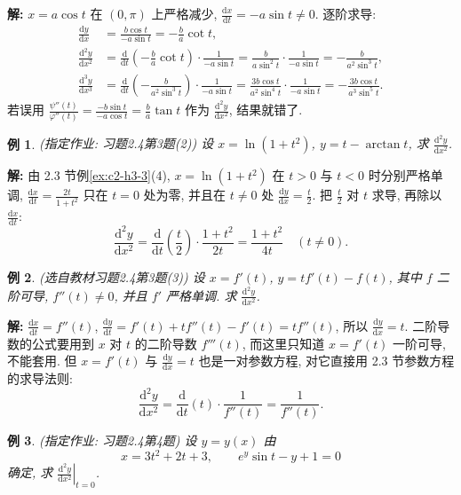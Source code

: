 \documentclass[UTF8,openany]{ctexbook}
\theoremstyle{chinesetextbook}
\newtheorem{example}{例}[section]
\newenvironment{cnsolution}{\par\indent\textbf{解:} \ignorespaces}{\par}
\newcommand{\dd}{\mathrm d}
\begin{document}
\begin{cnsolution}
$x=a\cos t$ 在 $(0,\pi)$ 上严格减少, $\displaystyle\frac{\dd x}{\dd t}=-a\sin t\ne0$. 逐阶求导:
\[
\begin{aligned}
\frac{\dd y}{\dd x}&=\frac{b\cos t}{-a\sin t}=-\frac ba\cot t,\\
\frac{\dd^2y}{\dd x^2}&=\frac{\dd}{\dd t}\left(-\frac ba\cot t\right)\cdot\frac1{-a\sin t}=\frac b{a\sin^2t}\cdot\frac1{-a\sin t}=-\frac b{a^2\sin^3t},\\
\frac{\dd^3y}{\dd x^3}&=\frac{\dd}{\dd t}\left(-\frac b{a^2\sin^3t}\right)\cdot\frac1{-a\sin t}=\frac{3b\cos t}{a^2\sin^4t}\cdot\frac1{-a\sin t}=-\frac{3b\cos t}{a^3\sin^5t}.
\end{aligned}
\]
若误用 $\displaystyle\frac{\psi''(t)}{\varphi''(t)}=\frac{-b\sin t}{-a\cos t}=\frac ba\tan t$ 作为 $\displaystyle\frac{\dd^2y}{\dd x^2}$, 结果就错了.
\end{cnsolution}
\begin{example}\label{ex:c2-h4-3b}
\textnormal{(指定作业: 习题2.4第3题(2))} 设 $x=\ln(1+t^2)$, $y=t-\arctan t$, 求 $\displaystyle\frac{\dd^2y}{\dd x^2}$.
\end{example}
\begin{cnsolution}
由 2.3 节例\ref{ex:c2-h3-3}(4), $x=\ln(1+t^2)$ 在 $t>0$ 与 $t<0$ 时分别严格单调, $\displaystyle\frac{\dd x}{\dd t}=\frac{2t}{1+t^2}$ 只在 $t=0$ 处为零, 并且在 $t\ne0$ 处 $\displaystyle\frac{\dd y}{\dd x}=\frac t2$. 把 $\displaystyle\frac t2$ 对 $t$ 求导, 再除以 $\displaystyle\frac{\dd x}{\dd t}$:
\[
\frac{\dd^2y}{\dd x^2}=\frac{\dd}{\dd t}\left(\frac t2\right)\cdot\frac{1+t^2}{2t}=\frac{1+t^2}{4t}\quad(t\ne0).
\]
\end{cnsolution}
\begin{example}\label{ex:c2-h4-3}
\textnormal{(选自教材习题2.4第3题(3))} 设 $x=f'(t)$, $y=tf'(t)-f(t)$, 其中 $f$ 二阶可导, $f''(t)\ne0$, 并且 $f'$ 严格单调. 求 $\displaystyle\frac{\dd^2y}{\dd x^2}$.
\end{example}
\begin{cnsolution}
$\displaystyle\frac{\dd x}{\dd t}=f''(t)$, $\displaystyle\frac{\dd y}{\dd t}=f'(t)+tf''(t)-f'(t)=tf''(t)$, 所以 $\displaystyle\frac{\dd y}{\dd x}=t$. 二阶导数的公式要用到 $x$ 对 $t$ 的二阶导数 $f'''(t)$, 而这里只知道 $x=f'(t)$ 一阶可导, 不能套用. 但 $x=f'(t)$ 与 $\displaystyle\frac{\dd y}{\dd x}=t$ 也是一对参数方程, 对它直接用 2.3 节参数方程的求导法则:
\[
\frac{\dd^2y}{\dd x^2}=\frac{\dd}{\dd t}(t)\cdot\frac1{f''(t)}=\frac1{f''(t)}.
\]
\end{cnsolution}
\begin{example}\label{ex:c2-h4-4}
\textnormal{(指定作业: 习题2.4第4题)} 设 $y=y(x)$ 由
\[
x=3t^2+2t+3,\qquad e^y\sin t-y+1=0
\]
确定, 求 $\displaystyle\left.\frac{\dd^2y}{\dd x^2}\right|_{t=0}$.
\end{example}
\end{document}
